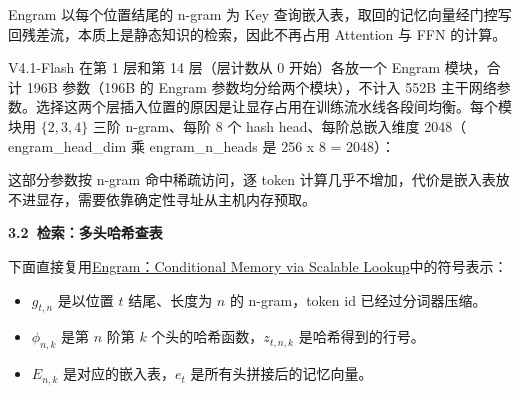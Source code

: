 \documentclass[zihao=false,fontset=windows]{ctexart}
\newcommand{\incode}[1]{\colorbox{inlinebg}{\ttfamily\small #1}}
\begin{document}
Engram 以每个位置结尾的 n-gram 为 Key 查询嵌入表，取回的记忆向量经门控写回残差流，本质上是静态知识的检索，因此不再占用 Attention 与 FFN 的计算。\par

V4.1-Flash 在第 1 层和第 14 层（层计数从 0 开始）各放一个 Engram 模块，合计 196B 参数（196B 的 Engram 参数均分给两个模块），不计入 552B 主干网络参数。选择这两个层插入位置的原因是让显存占用在训练流水线各段间均衡。每个模块用 $\{2,3,4\}$ 三阶 n-gram、每阶 8 个 hash head、每阶总嵌入维度 2048（ \incode{engram\_head\_dim} 乘 \incode{engram\_n\_heads} 是 256 x 8 = 2048）：\par


这部分参数按 n-gram 命中稀疏访问，逐 token 计算几乎不增加，代价是嵌入表放不进显存，需要依靠确定性寻址从主机内存预取。\par

\par{}\vspace{0.8em}\noindent \begin{tcolorbox}[boxrule=0pt,arc=3pt,colback=callOrange,left=3pt,right=3pt,top=2pt,bottom=2pt,before skip=0pt,after skip=0pt]{\bfseries \textcolor{feishuBlue}{3.2}\ 检索：多头哈希查表}\end{tcolorbox}\par\vspace{0.28em}

下面直接复用\href{https://scnajei2ds6y.feishu.cn/wiki/JwXTw0oUeimyoBk2QIgcSfBfn9g}{Engram：Conditional Memory via Scalable Lookup}中的符号表示：\par
\begin{itemize}
\item 
$g_{t,n}$ 是以位置 $t$ 结尾、长度为 $n$ 的 n-gram，token id 已经过分词器压缩。\par
\item 
$\phi_{n,k}$ 是第 $n$ 阶第 $k$ 个头的哈希函数，$z_{t,n,k}$ 是哈希得到的行号。\par
\item 
$E_{n,k}$ 是对应的嵌入表，$e_t$ 是所有头拼接后的记忆向量。\par
\end{itemize}
\end{document}
